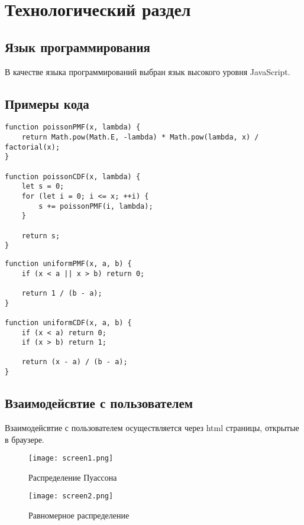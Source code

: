 \chapter{Технологический раздел}

\section{Язык программирования}
В качестве языка программирований выбран язык высокого уровня JavaScript.

\section{Примеры кода}

\begin{lstlisting}[caption={распределение Пуассона}]
function poissonPMF(x, lambda) {
    return Math.pow(Math.E, -lambda) * Math.pow(lambda, x) / factorial(x);
}

function poissonCDF(x, lambda) {
    let s = 0;
    for (let i = 0; i <= x; ++i) {
        s += poissonPMF(i, lambda);
    }

    return s;
}
\end{lstlisting}

\begin{lstlisting}[caption={Равномерное распределение}]
function uniformPMF(x, a, b) {
    if (x < a || x > b) return 0;

    return 1 / (b - a);
}

function uniformCDF(x, a, b) {
    if (x < a) return 0;
    if (x > b) return 1;
    
    return (x - a) / (b - a);
}
\end{lstlisting}

\section{Взаимодейсвтие с пользователем}

Взаимодейсвтие с пользователем осуществляется через html страницы, открытые в браузере.

\begin{figure}
  \centering
  \texttt{[image: screen1.png]}
  \caption{Распределение Пуассона}
\end{figure}

\begin{figure}
  \centering
  \texttt{[image: screen2.png]}
  \caption{Равномерное распределение}
\end{figure}
